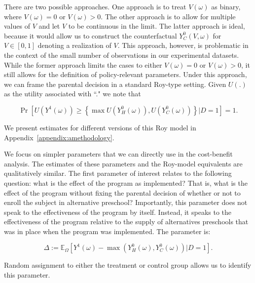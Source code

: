 There are two possible approaches. One approach is to treat $V \left( \omega \right)$ as binary, where $V \left( \omega \right) = 0$ or $V \left( \omega \right)  > 0$. The other approach is to allow for multiple values of $V$ and let $V$ to be continuous in the limit. The latter approach is ideal, because it would allow us to construct the counterfactual $Y_C^0 \left( V,  \omega \right) $ for $V \in [0 , 1]$ denoting a realization of $V$. This approach, however, is problematic in the context of the small number of observations in our experimental datasets. While the former approach limits the cases to either $V \left( \omega \right) = 0$ or $V \left( \omega \right)  > 0$, it still allows for the definition of policy-relevant parameters. Under this approach, we can frame the parental decision in a standard Roy-type setting. Given $U(.)$ as the utility associated with ``." we note that

\begin{equation}
\Pr \left[ U \left(Y^1 \left( \omega \right)\right) \geq \left\{ \max U \left(  Y_{H}^0 \left( \omega \right)\right) ,  U\left(Y_{C}^0 \left( \omega \right)   \right) \right\} \vert D =  1\right] = 1. 
\label{eq:noutility}
\end{equation}

We present estimates for different versions of this Roy model in Appendix~\ref{appendix:amethodology}.

We focus on simpler parameters that we can directly use in the cost-benefit analysis. The estimates of these parameters and the Roy-model equivalents are qualitatively similar. The first parameter of interest relates to the following question: what is the effect of the program as implemented? That is, what is the effect of the program without fixing the parental decision of whether or not to enroll the subject in alternative preschool? Importantly, this parameter does not speak to the effectiveness of the program by itself. Instead, it speaks to the effectiveness of the program relative to the supply of alternatives preschools that was in place when the program was implemented. The parameter is:

\begin{equation}
\Delta := \mathbb{E}_{\Omega} \left[ Y^1 \left( \omega \right) -  \max \left(  Y_{H}^0 \left( \omega \right) ,  Y_{C}^0 \left( \omega \right)  \right) | D =1 \right]. \label{eq:mainest}
\end{equation}

Random assignment to either the treatment or control group allows us to identify this parameter.

